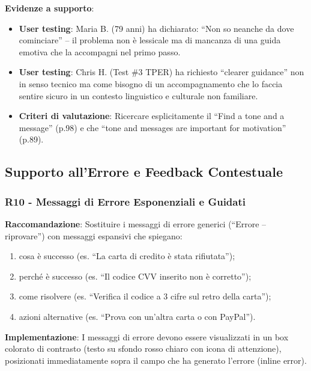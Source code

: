 ﻿\documentclass[11pt,a4paper]{article}
\begin{document}
\textbf{Evidenze a supporto}:
\begin{itemize}
    \item \textbf{User testing}: Maria B. (79 anni) ha dichiarato: ``Non so
    neanche da dove cominciare'' -- il problema non \`e lessicale ma di
    mancanza di una guida emotiva che la accompagni nel primo passo.
    \item \textbf{User testing}: Chris H. (Test \#3 TPER) ha richiesto
    ``clearer guidance'' non in senso tecnico ma come bisogno di un
    accompagnamento che lo faccia sentire sicuro in un contesto
    linguistico e culturale non familiare.
    \item \textbf{Criteri di valutazione}: Ricercare
    esplicitamente il ``Find a tone and a message'' (p.98) e che
    ``tone and messages are important for motivation'' (p.89).
\end{itemize}



\subsection{Supporto all'Errore e Feedback Contestuale}

\subsubsection{R10 - Messaggi di Errore Esponenziali e Guidati}
\label{rec:R10}

\textbf{Raccomandazione}: Sostituire i messaggi di errore generici
(“Errore -- riprovare”) con messaggi espansivi che spiegano:
\begin{enumerate}
    \item cosa \`e successo (es. “La carta di credito \`e stata rifiutata”);
    \item perch\'e \`e successo (es. “Il codice CVV inserito non \`e corretto”);
    \item come risolvere (es. “Verifica il codice a 3 cifre sul retro della
    carta”);
    \item azioni alternative (es. “Prova con un'altra carta o con PayPal”).
\end{enumerate}

\textbf{Implementazione}: I messaggi di errore devono essere visualizzati in
un box colorato di contrasto (testo su sfondo rosso chiaro con icona di
attenzione), posizionati immediatamente sopra il campo che ha generato
l'errore (inline error).
\end{document}

